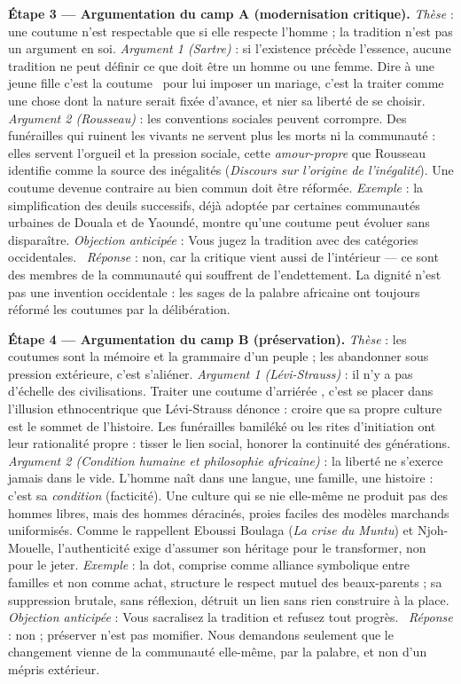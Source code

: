 \documentclass[11pt]{article}
\begin{document}
\begin{exoresolu}
\textbf{Étape 3 — Argumentation du camp A (modernisation critique).}
\emph{Thèse} : une coutume n'est respectable que si elle respecte l'homme ; la tradition n'est pas un argument en soi.
\emph{Argument 1 (Sartre)} : si l'existence précède l'essence, aucune tradition ne peut définir ce que doit être un homme ou une femme. Dire à une jeune fille \guillemotleft c'est la coutume \guillemotright\ pour lui imposer un mariage, c'est la traiter comme une chose dont la nature serait fixée d'avance, et nier sa liberté de se choisir.
\emph{Argument 2 (Rousseau)} : les conventions sociales peuvent corrompre. Des funérailles qui ruinent les vivants ne servent plus les morts ni la communauté : elles servent l'orgueil et la pression sociale, cette \emph{amour-propre} que Rousseau identifie comme la source des inégalités (\emph{Discours sur l'origine de l'inégalité}). Une coutume devenue contraire au bien commun doit être réformée.
\emph{Exemple} : la simplification des deuils successifs, déjà adoptée par certaines communautés urbaines de Douala et de Yaoundé, montre qu'une coutume peut évoluer sans disparaître.
\emph{Objection anticipée} : \guillemotleft Vous jugez la tradition avec des catégories occidentales. \guillemotright\ \emph{Réponse} : non, car la critique vient aussi de l'intérieur — ce sont des membres de la communauté qui souffrent de l'endettement. La dignité n'est pas une invention occidentale : les sages de la palabre africaine ont toujours réformé les coutumes par la délibération.

\textbf{Étape 4 — Argumentation du camp B (préservation).}
\emph{Thèse} : les coutumes sont la mémoire et la grammaire d'un peuple ; les abandonner sous pression extérieure, c'est s'aliéner.
\emph{Argument 1 (Lévi-Strauss)} : il n'y a pas d'échelle des civilisations. Traiter une coutume d'\guillemotleft arriérée \guillemotright, c'est se placer dans l'illusion ethnocentrique que Lévi-Strauss dénonce : croire que sa propre culture est le sommet de l'histoire. Les funérailles bamiléké ou les rites d'initiation ont leur rationalité propre : tisser le lien social, honorer la continuité des générations.
\emph{Argument 2 (Condition humaine et philosophie africaine)} : la liberté ne s'exerce jamais dans le vide. L'homme naît dans une langue, une famille, une histoire : c'est sa \emph{condition} (facticité). Une culture qui se nie elle-même ne produit pas des hommes libres, mais des hommes déracinés, proies faciles des modèles marchands uniformisés. Comme le rappellent Eboussi Boulaga (\emph{La crise du Muntu}) et Njoh-Mouelle, l'authenticité exige d'assumer son héritage pour le transformer, non pour le jeter.
\emph{Exemple} : la dot, comprise comme alliance symbolique entre familles et non comme achat, structure le respect mutuel des beaux-parents ; sa suppression brutale, sans réflexion, détruit un lien sans rien construire à la place.
\emph{Objection anticipée} : \guillemotleft Vous sacralisez la tradition et refusez tout progrès. \guillemotright\ \emph{Réponse} : non ; préserver n'est pas momifier. Nous demandons seulement que le changement vienne de la communauté elle-même, par la palabre, et non d'un mépris extérieur.


\end{exoresolu}
\end{document}
